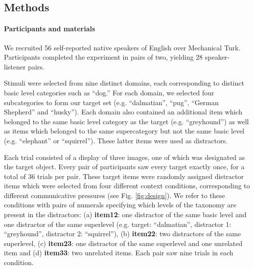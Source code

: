 \documentclass[10pt,letterpaper]{article}
\newcommand{\ndg}[1]{\textcolor{Green}{[ndg: #1]}}
\begin{document}
\subsection{Methods}


\paragraph{Participants and materials}
We recruited 56 self-reported native speakers of English over Mechanical Turk. Participants completed the experiment in pairs of two, yielding 28 speaker-listener pairs.

Stimuli were selected from nine distinct domains, each corresponding to distinct basic level categories such as ``dog.'' For each domain, we selected four subcategories to form our target set (e.g. ``dalmatian'', ``pug'', ``German Shepherd'' and ``husky''). Each domain also contained an additional item which belonged to the same basic level category as the target (e.g. ``greyhound'') as well as items which belonged to the same supercategory but not the same basic level (e.g. ``elephant'' or ``squirrel''). These latter items were used as distractors.

Each trial consisted of a display of three images, one of which was designated as the target object. Every pair of participants saw every target exactly once, for a total of 36 trials per pair. These target items were randomly assigned distractor items which were selected from four different context conditions, corresponding to different communicative pressures (see Fig. \ref{fig:design}). We refer to these conditions with pairs of numerals specifying which levels of the taxonomy are present in the distractors: (a) \textbf{item12}: one distractor of the same basic level and one distractor of the same superlevel (e.g. target: ``dalmatian'', distractor 1: ``greyhound'', distractor 2: ``squirrel''), (b) \textbf{item22}: two distractors of the same superlevel, (c) \textbf{item23}: one distractor of the same superlevel and one unrelated item and (d) \textbf{item33}: two unrelated items.  Each pair saw nine trials in each condition. 
\end{document}
